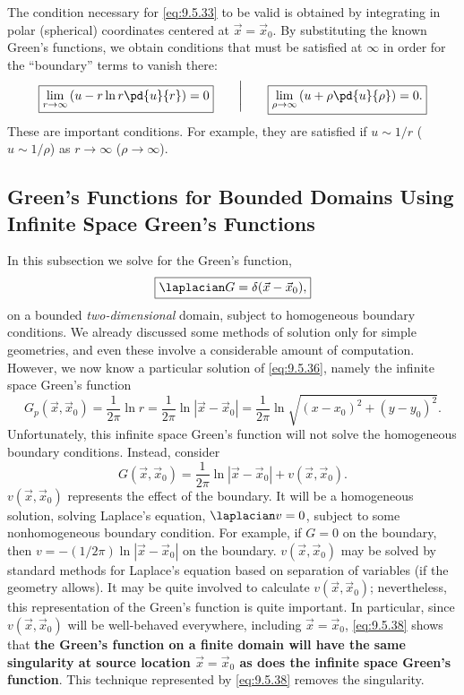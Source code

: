 The condition necessary for \eqref{eq:9.5.33} to be valid is obtained by integrating in polar (spherical) coordinates centered at $\vec{x} = \vec{x}_0$.  By substituting the known Green's functions, we obtain conditions that must be satisfied at $\infty$ in order for the ``boundary'' terms to vanish there:
\begin{equation}
\label{eq:9.5.35}
\boxed{\lim_{r\to\infty}\left(u - r\ln r\pd{u}{r}\right) = 0} \qquad\bigg|\qquad \boxed{\lim_{\rho\to\infty}\left(u + \rho\pd{u}{\rho}\right) = 0.}
\end{equation}
These are important conditions.  For example, they are satisfied if $u \sim 1/r$ ($u \sim 1/\rho$) as $r \to \infty$ ($\rho \to \infty$).

\subsection{Green's Functions for Bounded Domains Using Infinite Space Green's Functions}
\label{sec:greens-bounded-infinite}

In this subsection we solve for the Green's function,
\begin{equation}
\label{eq:9.5.36}
\boxed{\laplacian G = \delta(\vec{x}-\vec{x}_0),}
\end{equation}
on a bounded \emph{two-dimensional} domain, subject to homogeneous boundary conditions.  We already discussed some methods of solution only for simple geometries, and even these involve a considerable amount of computation.  However, we now know a particular solution of \eqref{eq:9.5.36}, namely the infinite space Green's function
\begin{equation}
\label{eq:9.5.37}
G_p(\vec{x},\vec{x}_0) = \frac{1}{2\pi}\ln r = \frac{1}{2\pi}\ln|\vec{x}-\vec{x}_0| = \frac{1}{2\pi}\ln\sqrt{(x-x_0)^2+(y-y_0)^2}.
\end{equation}
Unfortunately, this infinite space Green's function will not solve the homogeneous boundary conditions.  Instead, consider
\begin{equation}
\label{eq:9.5.38}
\boxed{G(\vec{x},\vec{x}_0) = \frac{1}{2\pi}\ln|\vec{x}-\vec{x}_0| + v(\vec{x},\vec{x}_0).}
\end{equation}
$v(\vec{x},\vec{x}_0)$ represents the effect of the boundary.  It will be a homogeneous solution, solving Laplace's equation, $\laplacian v = 0$, subject to some nonhomogeneous boundary condition.  For example, if $G = 0$ on the boundary, then $v = -(1/2\pi)\ln|\vec{x}-\vec{x}_0|$ on the boundary.  $v(\vec{x},\vec{x}_0)$ may be solved by standard methods for Laplace's equation based on separation of variables (if the geometry allows).  It may be quite involved to calculate $v(\vec{x},\vec{x}_0)$; nevertheless, this representation of the Green's function is quite important.  In particular, since $v(\vec{x},\vec{x}_0)$ will be well-behaved everywhere, including $\vec{x} = \vec{x}_0$, \eqref{eq:9.5.38} shows that \textbf{the Green's function on a finite domain will have the same singularity at source location $\vec{x} = \vec{x}_0$ as does the infinite space Green's function}.  This technique represented by \eqref{eq:9.5.38} removes the singularity.

